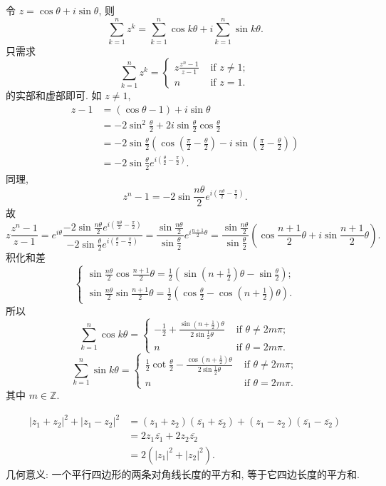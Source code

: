 \documentclass{homework}
\begin{document}
令 \(z=\cos\theta+i\sin\theta\), 则
\[\sum_{k=1}^nz^k=\sum_{k=1}^n\cos{k\theta}+i\sum_{k=1}^n\sin{k\theta}.\]
只需求
\[\sum_{k=1}^nz^k=\begin{cases}
z\frac{z^n-1}{z-1} & \text{ if } z \neq 1;\\
n & \text{ if } z = 1.
\end{cases}\]
的实部和虚部即可. 如 \(z\neq1\),
\begin{align*}
  z-1&=(\cos\theta-1)+i\sin\theta\\
  &=-2\sin^2\frac{\theta}{2}+2i\sin\frac{\theta}{2}\cos\frac{\theta}{2}\\
  &=-2\sin\frac{\theta}{2}\left(\cos(\frac{\pi}{2}-\frac{\theta}{2})-i\sin(\frac{\pi}{2}-\frac{\theta}{2})\right)\\
  &=-2\sin\frac{\theta}{2}e^{i(\frac{\theta}{2}-\frac{\pi}{2})}.
\end{align*}
同理,
\[z^n-1=-2\sin\frac{n\theta}{2}e^{i(\frac{n\theta}{2}-\frac{\pi}{2})}.\]
故
\[z\frac{z^n-1}{z-1}=e^{i\theta}\frac{-2\sin\frac{n\theta}{2}e^{i(\frac{n\theta}{2}-\frac{\pi}{2})}}{-2\sin\frac{\theta}{2}e^{i(\frac{\theta}{2}-\frac{\pi}{2})}}=\frac{\sin\frac{n\theta}{2}}{\sin\frac{\theta}{2}}e^{i\frac{n+1}{2}\theta}=\frac{\sin\frac{n\theta}{2}}{\sin\frac{\theta}{2}}\left(\cos\frac{n+1}{2}\theta+i\sin\frac{n+1}{2}\theta\right).\]
积化和差
\[\begin{cases}
\sin\frac{n\theta}{2}\cos\frac{n+1}{2}\theta=\frac{1}{2}\left(\sin(n+\frac{1}{2})\theta-\sin\frac{\theta}{2}\right);\\
\sin\frac{n\theta}{2}\sin\frac{n+1}{2}\theta=\frac{1}{2}\left(\cos\frac{\theta}{2}-\cos(n+\frac{1}{2})\theta\right).
\end{cases}\]
所以
\[\sum_{k=1}^n\cos{k\theta}=\begin{cases}
-\frac{1}{2}+\frac{\sin(n+\frac{1}{2})\theta}{2\sin\frac{1}{2}\theta} & \text{ if } \theta \neq 2m\pi;\\
n & \text{ if } \theta = 2m\pi.
\end{cases}\]
\[\sum_{k=1}^n\sin{k\theta}=\begin{cases}
\frac{1}{2}\cot\frac{\theta}{2}-\frac{\cos(n+\frac{1}{2})\theta}{2\sin\frac{1}{2}\theta} & \text{ if } \theta \neq 2m\pi;\\
n & \text{ if } \theta = 2m\pi.
\end{cases}\]
其中 \(m\in\mathbb{Z}\).

\begin{align*}
\lvert z_1+z_2\rvert^2+\lvert z_1-z_2\rvert^2&=(z_1+z_2)(\overline{z_1}+\overline{z_2})+(z_1-z_2)(\overline{z_1}-\overline{z_2})\\
&=2z_1\overline{z_1}+2z_2\overline{z_2}\\
&=2(\lvert z_1\rvert^2+\lvert z_2\rvert^2).
\end{align*}
几何意义: 一个平行四边形的两条对角线长度的平方和, 等于它四边长度的平方和.
\end{document}
